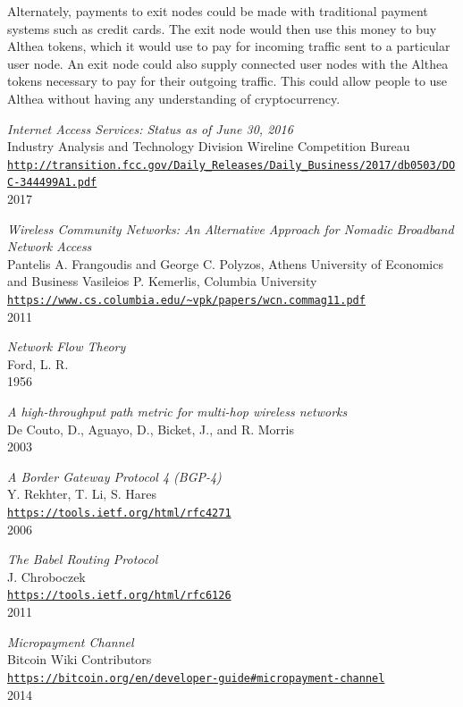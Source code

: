 \documentclass[11pt]{article}
\begin{document}
Alternately, payments to exit nodes could be made with traditional payment systems such as credit cards. The exit node would then use this money to buy Althea tokens, which it would use to pay for incoming traffic sent to a particular user node. An exit node could also supply connected user nodes with the Althea tokens necessary to pay for their outgoing traffic. This could allow people to use Althea without having any understanding of cryptocurrency.

\begin{thebibliography}{99}

\emph{Internet Access Services: Status as of June 30, 2016}\\
Industry Analysis and Technology Division Wireline Competition Bureau\\
\texttt{\url{http://transition.fcc.gov/Daily_Releases/Daily_Business/2017/db0503/DOC-344499A1.pdf}}\\
2017

\emph{Wireless Community Networks:
An Alternative Approach for Nomadic Broadband Network Access}\\
Pantelis A. Frangoudis and George C. Polyzos, Athens University of Economics and Business Vasileios P. Kemerlis, Columbia University\\
\texttt{\url{https://www.cs.columbia.edu/~vpk/papers/wcn.commag11.pdf}}\\
2011

\emph{Network Flow Theory}\\
Ford, L. R.\\
1956

\emph{A high-throughput path metric for multi-hop wireless networks}\\
De Couto, D., Aguayo, D., Bicket, J., and R. Morris\\
2003

\emph{A Border Gateway Protocol 4 (BGP-4)}\\
Y. Rekhter, T. Li, S. Hares\\
\texttt{\url{https://tools.ietf.org/html/rfc4271}}\\
2006

\emph{The Babel Routing Protocol}\\
J. Chroboczek\\
\texttt{\url{https://tools.ietf.org/html/rfc6126}}\\
2011

\emph{Micropayment Channel}\\
Bitcoin Wiki Contributors\\
\texttt{\url{https://bitcoin.org/en/developer-guide\#micropayment-channel}}\\
2014


\end{thebibliography}
\end{document}
